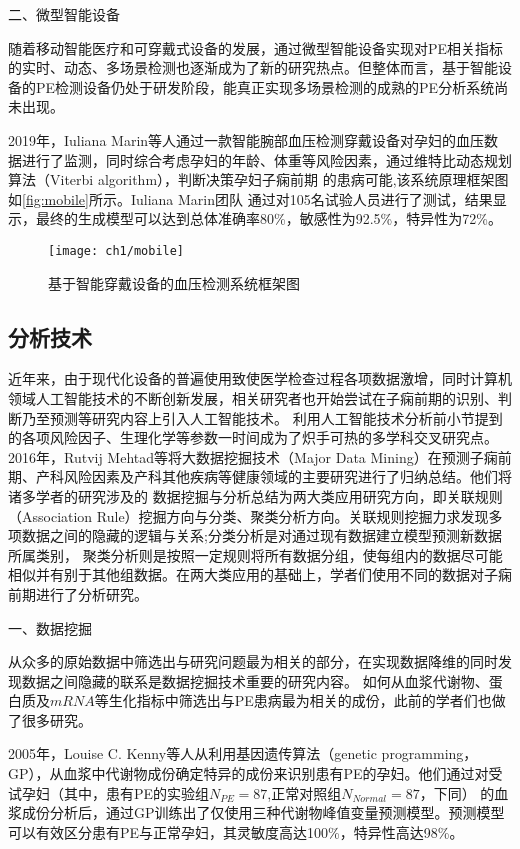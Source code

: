 二、微型智能设备

随着移动智能医疗和可穿戴式设备的发展，通过微型智能设备实现对PE相关指标的实时、动态、多场景检测也逐渐成为了新的研究热点。但整体而言，基于智能设备的PE检测设备仍处于研发阶段，能真正实现多场景检测的成熟的PE分析系统尚未出现。
% 

2019年，Iuliana Marin等人\cite{Marin2019,Marin2020}通过一款智能腕部血压检测穿戴设备对孕妇的血压数据进行了监测，同时综合考虑孕妇的年龄、体重等风险因素，通过维特比动态规划算法（Viterbi algorithm），判断决策孕妇子痫前期
的患病可能,该系统原理框架图如\autoref{fig:mobile}所示。Iuliana Marin团队
通过对105名试验人员进行了测试，结果显示，最终的生成模型可以达到总体准确率80\%，敏感性为92.5\%，特异性为72\%\cite{Marin2019}。
\begin{figure}[htbp]
    \centering
    \texttt{[image: ch1/mobile]}
    \caption{\label{fig:mobile}基于智能穿戴设备的血压检测系统框架图}
\end{figure}

\subsection{分析技术}
近年来，由于现代化设备的普遍使用致使医学检查过程各项数据激增，同时计算机领域人工智能技术的不断创新发展，相关研究者也开始尝试在子痫前期的识别、判断乃至预测等研究内容上引入人工智能技术。
利用人工智能技术分析前小节提到的各项风险因子、生理化学等参数一时间成为了炽手可热的多学科交叉研究点。
2016年，Rutvij Mehtad等\cite{Mehta2016}将大数据挖掘技术（Major Data Mining）在预测子痫前期、产科风险因素及产科其他疾病等健康领域的主要研究进行了归纳总结。他们将诸多学者的研究涉及的
数据挖掘与分析总结为两大类应用研究方向，即关联规则（Association Rule）挖掘方向与分类、聚类分析方向。关联规则挖掘力求发现多项数据之间的隐藏的逻辑与关系;分类分析是对通过现有数据建立模型预测新数据所属类别，
聚类分析则是按照一定规则将所有数据分组，使每组内的数据尽可能相似并有别于其他组数据\cite{Han2006}。在两大类应用的基础上，学者们使用不同的数据对子痫前期进行了分析研究。

一、数据挖掘

从众多的原始数据中筛选出与研究问题最为相关的部分，在实现数据降维的同时发现数据之间隐藏的联系是数据挖掘技术重要的研究内容。
如何从血浆代谢物、蛋白质及$mRNA$等生化指标中筛选出与PE患病最为相关的成份，此前的学者们也做了很多研究。

2005年，Louise C. Kenny等人\cite{Kenny2005}从利用基因遗传算法（genetic programming，GP），从血浆中代谢物成份确定特异的成份来识别患有PE的孕妇。他们通过对受试孕妇（其中，患有PE的实验组$N_{PE}=87$,正常对照组$N_{Normal}=87$，下同）
的血浆成份分析后，通过GP训练出了仅使用三种代谢物峰值变量预测模型。预测模型可以有效区分患有PE与正常孕妇，其灵敏度高达100\%，特异性高达98\%。

